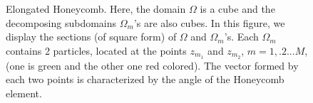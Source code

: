 \documentclass{article}
\begin{document}
\begin{figure}[h]
    \centering
    \caption{Elongated Honeycomb. Here, the domain $\Omega$ is a cube and the decomposing subdomains $\Omega_m$'s are also cubes. In this figure, we display the sections (of square form) of $\Omega$ and $\Omega_m$'s. Each $\Omega_m$ contains 2 particles, located at the points $z_{m_{1}}$ and $z_{m_{2}}$, $m=1, .2... M$, (one is green and the other one red colored). The vector formed by each two points is characterized by the angle of the Honeycomb element.}
    \label{fig:ElongatedHoneycomb}
\end{figure}
\end{document}
